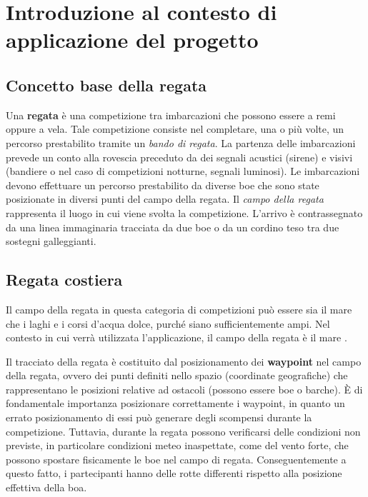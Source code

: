 \chapter{Introduzione al contesto di applicazione del progetto}

\section{Concetto base della regata}
Una \textbf{regata} è una competizione tra imbarcazioni che possono essere a remi oppure a vela. Tale competizione consiste nel completare, una o più volte, un percorso prestabilito tramite un \textit{bando di regata}\cite{regata_costiera}. La partenza delle imbarcazioni prevede un conto alla rovescia preceduto da dei segnali acustici (sirene) e visivi (bandiere o nel caso di competizioni notturne, segnali luminosi). Le imbarcazioni devono effettuare un percorso prestabilito da diverse boe che sono state posizionate in diversi punti del campo della regata. Il \textit{campo della regata} rappresenta il luogo in cui viene svolta la competizione. L'arrivo è contrassegnato da una linea immaginaria tracciata da due boe o da un cordino teso tra due sostegni galleggianti. 

\section{Regata costiera}
Il campo della regata in questa categoria di competizioni può essere sia il mare che i laghi e i corsi d'acqua dolce, purché siano sufficientemente ampi. Nel contesto in cui verrà utilizzata l'applicazione, il campo della regata è il mare \cite{vela_sport}.

Il tracciato della regata è costituito dal posizionamento dei \textbf{waypoint} nel campo della regata, ovvero dei punti definiti nello spazio (coordinate geografiche) che rappresentano le posizioni relative ad ostacoli (possono essere boe o barche). È di fondamentale importanza posizionare correttamente i waypoint, in quanto un errato posizionamento di essi può generare degli scompensi durante la competizione. Tuttavia, durante la regata possono verificarsi delle condizioni non previste, in particolare condizioni meteo inaspettate, come del vento forte, che possono spostare fisicamente le boe nel campo di regata. Conseguentemente a questo fatto, i partecipanti hanno delle rotte differenti rispetto alla posizione effettiva della boa.

